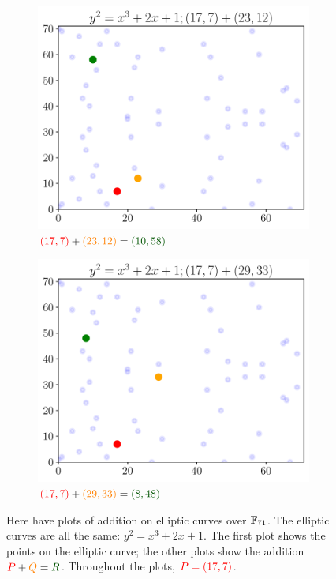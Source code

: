 \begin{figure}[p]
    \begin{subfigure}[t]{0.45\textwidth}
    \includegraphics[width=\textwidth]{plots/ec_finite/ec_finite_F_71_2_1_addition_23_12.pdf}
    \caption{$\textcolor{red}{\parens{17,7}}
        + \textcolor{orange}{\parens{23,12}}
        = \textcolor[rgb]{0,0.33,0}{\parens{10,58}}$}
    \end{subfigure}
    \begin{subfigure}[t]{0.45\textwidth}
    \includegraphics[width=\textwidth]{plots/ec_finite/ec_finite_F_71_2_1_addition_29_33.pdf}
    \caption{$\textcolor{red}{\parens{17,7}}
        + \textcolor{orange}{\parens{29,33}}
        = \textcolor[rgb]{0,0.33,0}{\parens{8,48}}$}
    \end{subfigure}
    \caption[Plots of elliptic curve addition over finite fields]{Here
        have plots of addition on \glspl{elliptic curve} over $\mathbb{F}_{71}$.
        The \glspl{elliptic curve} are all the same: $y^{2} = x^{3} + 2x + 1$.
        The first plot shows the points on the \gls{elliptic curve};
        the other plots show the addition
        $\textcolor{red}{P} + \textcolor{orange}{Q}
            = \textcolor[rgb]{0,0.33,0}{R}$.
        Throughout the plots, $\color{red} P = \left( 17,7 \right)$.
        }
    \label{fig:ec_finite_plots_addition}
\end{figure}
